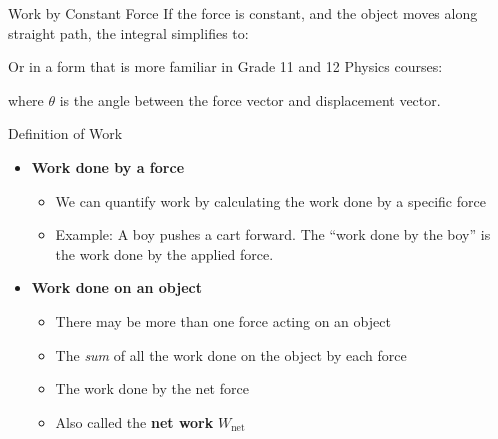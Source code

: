 \documentclass[12pt,compress,aspectratio=169]{beamer}
\newcommand{\mb}[1]{\ensuremath\mathbf{#1}}
\newcommand{\eq}[2]{\vspace{#1}{\Large\begin{displaymath}#2\end{displaymath}}}
\begin{document}
\begin{frame}{Work by Constant Force}
  If the force is constant, and the object moves along straight path, the
  integral simplifies to:

  \eq{-.4in}{
    \boxed{W=\mb{F}\cdot\Delta\mb{r}}
  }

  \vspace{-.2in}Or in a form that is more familiar in Grade 11 and 12 Physics
  courses:

  \eq{-.4in}{
    \boxed{W=F\Delta r\cos\theta}
  }

  \vspace{-.3in}where $\theta$ is the angle between the force vector and
  displacement vector.
\end{frame}



\begin{frame}{Definition of Work}
  \begin{itemize}
  \item\textbf{Work done by a force}
    \begin{itemize}
    \item We can quantify work by calculating the work done by a specific force
    \item Example: A boy pushes a cart forward. The ``work done by the boy'' is
      the work done by the applied force.
    \end{itemize}
  \item\textbf{Work done on an object}
    \begin{itemize}
    \item There may be more than one force acting on an object
    \item The \emph{sum} of all the work done on the object by each force
    \item The work done by the net force
    \item Also called the \textbf{net work} $W_\mathrm{net}$
    \end{itemize}
  \end{itemize}
\end{frame}
\end{document}
